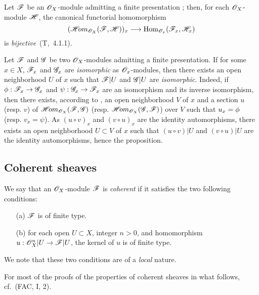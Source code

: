 \begin{env}[5.2.6]
\label{0.5.2.6}
Let $\mathscr{F}$ be an $\mathscr{O}_X$-module admitting a finite presentation ;
then, for each $\mathscr{O}_X$-module $\mathscr{H}$, the canonical functorial homomorphism
\[
  (\shHom_{\sh{O}_X}(\sh{F},\sh{H}))_x\to\Hom_{\sh{O}_x}(\sh{F}_x,\sh{H}_x)
\]
is \emph{bijective}~(T,~4.1.1).
\end{env}

\begin{env}[5.2.7]
\label{0.5.2.7}
Let $\mathscr{F}$ and $\mathscr{G}$ be two $\mathscr{O}_X$-modules admitting a finite presentation.
If for some $x\in X$, $\mathscr{F}_x$ and $\mathscr{G}_x$ are \emph{isomorphic} as $\mathscr{O}_x$-modules, then there exists an open neighborhood $U$ of $x$ such that $\mathscr{F}|U$ and $\mathscr{G}|U$ are \emph{isomorphic}.
Indeed, if $\vphi:\sh{F}_x\to\sh{G}_x$ and $\psi:\sh{G}_x\to\sh{F}_x$ are an isomorphism and its inverse isomorphism, then there exists, according to , an open neighborhood $V$ of $x$ and a section $u$ (resp. $v$) of $\mathscr{H}\!{om}_{\mathscr{O}_X}(\mathscr{F},\mathscr{G})$ (resp. $\mathscr{H}\!{om}_{\mathscr{O}_X}(\mathscr{G},\mathscr{F})$) over $V$ such
that $u_x=\phi$ (resp. $v_x=\psi$).
As $(u\circ v)_x$ and $(v\circ u)_x$ are the identity automorphisms, there exists an open neighborhood $U\subset V$ of $x$ such that $(u\circ v)|U$ and $(v\circ u)|U$ are the identity automorphisms, hence the proposition.
\end{env}

\subsection{Coherent sheaves}
\label{subsection:0.5.3}

\begin{env}[5.3.1]
\label{0.5.3.1}
We say that an $\mathscr{O}_X$-module $\mathscr{F}$ is \emph{coherent} if it satisfies the two following conditions:
\begin{enumerate}
  \item[(a)] $\mathscr{F}$ is of finite type.
  \item[(b)] for each open $U\subset X$, integer $n>0$, and homomorphism $u:\sh{O}_X^n|U\to\sh{F}|U$, the kernel of $u$ is of finite type.
\end{enumerate}
We note that these two conditions are of a \emph{local} nature.

For most of the proofs of the properties of coherent sheaves in what follows, cf.~(FAC, I, 2).
\end{env}

